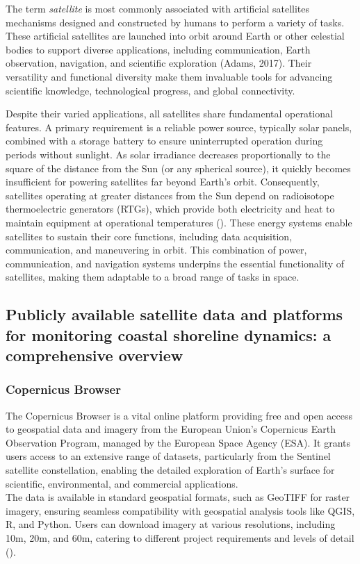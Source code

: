 \documentclass[a4paper,12pt]{article}
\begin{document}
The term \textit{satellite} is most commonly associated with artificial satellites mechanisms designed and constructed by humans to perform a variety of tasks. These artificial satellites are launched into orbit around Earth or other celestial bodies to support diverse applications, including communication, Earth observation, navigation, and scientific exploration (Adams, 2017). Their versatility and functional diversity make them invaluable tools for advancing scientific knowledge, technological progress, and global connectivity.  

Despite their varied applications, all satellites share fundamental operational features. A primary requirement is a reliable power source, typically solar panels, combined with a storage battery to ensure uninterrupted operation during periods without sunlight. As solar irradiance decreases proportionally to the square of the distance from the Sun (or any spherical source), it quickly becomes insufficient for powering satellites far beyond Earth's orbit. Consequently, satellites operating at greater distances from the Sun depend on radioisotope thermoelectric generators (RTGs), which provide both electricity and heat to maintain equipment at operational temperatures (\cite{nasa_cassinis_nodate}). These energy systems enable satellites to sustain their core functions, including data acquisition, communication, and maneuvering in orbit. This combination of power, communication, and navigation systems underpins the essential functionality of satellites, making them adaptable to a broad range of tasks in space.

\subsection{Publicly available satellite data and platforms for monitoring coastal shoreline dynamics: a comprehensive overview}
\subsubsection{Copernicus Browser}
The Copernicus Browser is a vital online platform providing free and open access to geospatial data and imagery from the European Union's Copernicus Earth Observation Program, managed by the European Space Agency (ESA). It grants users access to an extensive range of datasets, particularly from the Sentinel satellite constellation, enabling the detailed exploration of Earth’s surface for scientific, environmental, and commercial applications. \\
The data is available in standard geospatial formats, such as GeoTIFF for raster imagery, ensuring seamless compatibility with geospatial analysis tools like QGIS, R, and Python. Users can download imagery at various resolutions, including 10m, 20m, and 60m, catering to different project requirements and levels of detail (\cite{sinergise_solutions_copernicus_nodate}).
\end{document}
